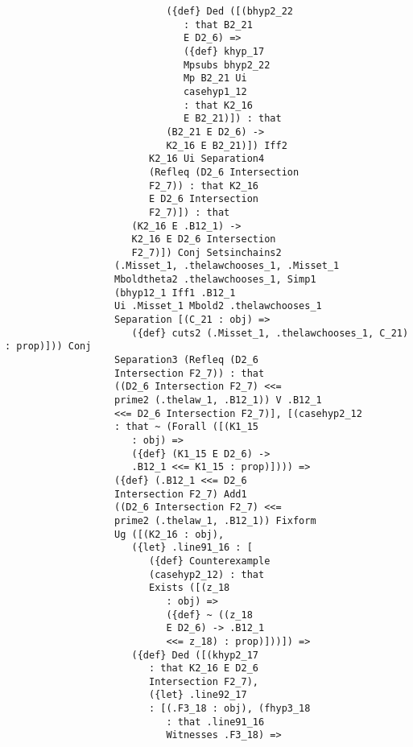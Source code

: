 \documentclass[12pt]{article}
\begin{document}
\begin{verbatim}
                            ({def} Ded ([(bhyp2_22 
                               : that B2_21 
                               E D2_6) => 
                               ({def} khyp_17 
                               Mpsubs bhyp2_22 
                               Mp B2_21 Ui 
                               casehyp1_12 
                               : that K2_16 
                               E B2_21)]) : that 
                            (B2_21 E D2_6) -> 
                            K2_16 E B2_21)]) Iff2 
                         K2_16 Ui Separation4 
                         (Refleq (D2_6 Intersection 
                         F2_7)) : that K2_16 
                         E D2_6 Intersection 
                         F2_7)]) : that 
                      (K2_16 E .B12_1) -> 
                      K2_16 E D2_6 Intersection 
                      F2_7)]) Conj Setsinchains2 
                   (.Misset_1, .thelawchooses_1, .Misset_1 
                   Mboldtheta2 .thelawchooses_1, Simp1 
                   (bhyp12_1 Iff1 .B12_1 
                   Ui .Misset_1 Mbold2 .thelawchooses_1 
                   Separation [(C_21 : obj) => 
                      ({def} cuts2 (.Misset_1, .thelawchooses_1, C_21) : prop)])) Conj 
                   Separation3 (Refleq (D2_6 
                   Intersection F2_7)) : that 
                   ((D2_6 Intersection F2_7) <<= 
                   prime2 (.thelaw_1, .B12_1)) V .B12_1 
                   <<= D2_6 Intersection F2_7)], [(casehyp2_12 
                   : that ~ (Forall ([(K1_15 
                      : obj) => 
                      ({def} (K1_15 E D2_6) -> 
                      .B12_1 <<= K1_15 : prop)]))) => 
                   ({def} (.B12_1 <<= D2_6 
                   Intersection F2_7) Add1 
                   ((D2_6 Intersection F2_7) <<= 
                   prime2 (.thelaw_1, .B12_1)) Fixform 
                   Ug ([(K2_16 : obj), 
                      ({let} .line91_16 : [
                         ({def} Counterexample 
                         (casehyp2_12) : that 
                         Exists ([(z_18 
                            : obj) => 
                            ({def} ~ ((z_18 
                            E D2_6) -> .B12_1 
                            <<= z_18) : prop)]))]) => 
                      ({def} Ded ([(khyp2_17 
                         : that K2_16 E D2_6 
                         Intersection F2_7), 
                         ({let} .line92_17 
                         : [(.F3_18 : obj), (fhyp3_18 
                            : that .line91_16 
                            Witnesses .F3_18) => 

\end{verbatim}
\end{document}
